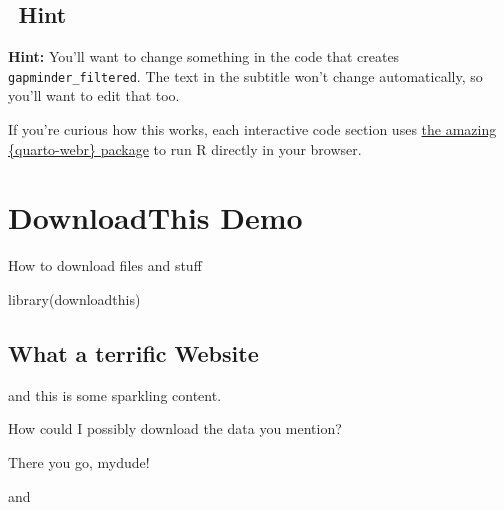 \documentclass[
  letterpaper,
  DIV=11,
  numbers=noendperiod]{scrreprt}
\newenvironment{Shaded}{\begin{snugshade}}{\end{snugshade}}
\newcommand{\FunctionTok}[1]{\textcolor[rgb]{0.28,0.35,0.67}{#1}}
\newcommand{\NormalTok}[1]{\textcolor[rgb]{0.00,0.23,0.31}{#1}}
\begin{document}
\begin{tcolorbox}[enhanced jigsaw, colframe=quarto-callout-important-color-frame, leftrule=.75mm, breakable, toprule=.15mm, arc=.35mm, rightrule=.15mm, colback=white, opacityback=0, bottomrule=.15mm, left=2mm]
\begin{minipage}[t]{\textwidth - 5.5mm}
\section{\texorpdfstring{ Hint}{ Hint}}

\textbf{Hint:} You'll want to change something in the code that creates
\texttt{gapminder\_filtered}. The text in the subtitle won't change
automatically, so you'll want to edit that too.

\end{minipage}%
\end{tcolorbox}

If you're curious how this works, each interactive code section uses
\href{https://quarto-webr.thecoatlessprofessor.com/}{the amazing
\{quarto-webr\} package} to run R directly in your browser.


\chapter{DownloadThis Demo}\label{downloadthis-demo}

How to download files and stuff

\hfill\break

\begin{Shaded}
\begin{Highlighting}[]
\FunctionTok{library}\NormalTok{(downloadthis)}
\end{Highlighting}
\end{Shaded}

\section{What a terrific Website}\label{what-a-terrific-website}

and this is some sparkling content.

How could I possibly download the data you mention?

There you go, mydude!

and
\end{document}
